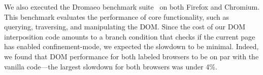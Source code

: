 We also executed the Dromaeo benchmark suite~\cite{dromaeo} on both
Firefox and Chromium.
%
This benchmark evaluates the performance of core functionality,
such as querying, traversing, and manipulating the DOM.
%
Since the cost of our DOM interposition code amounts to a branch
condition that checks if the current page has enabled
confinement-mode, we expected the slowdown to be minimal. Indeed, we
found that DOM performance for both labeled browsers to be on par with
the vanilla code---the largest slowdown for both browsers was under
4\%.




